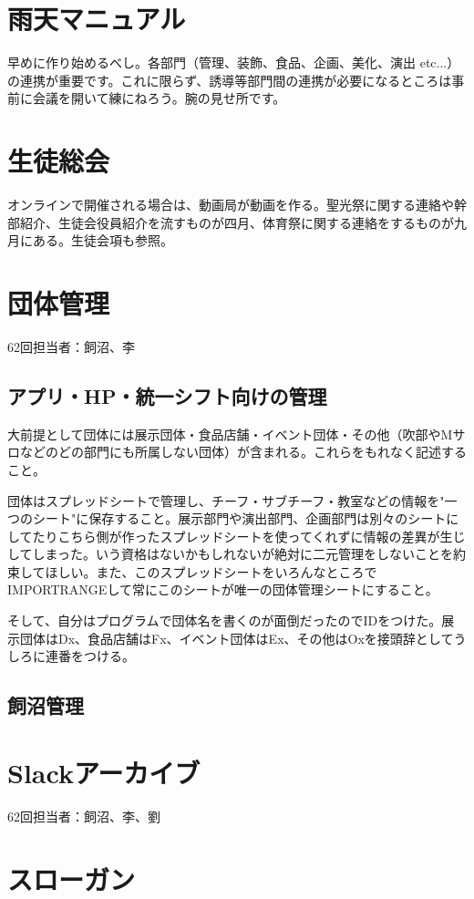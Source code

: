 \documentclass[dvipdfmx,jb5]{jreport}
\begin{document}
\section{雨天マニュアル}
早めに作り始めるべし。各部門（管理、装飾、食品、企画、美化、演出 etc...）の連携が重要です。これに限らず、誘導等部門間の連携が必要になるところは事前に会議を開いて練にねろう。腕の見せ所です。

\section{生徒総会}
オンラインで開催される場合は、動画局が動画を作る。聖光祭に関する連絡や幹部紹介、生徒会役員紹介を流すものが四月、体育祭に関する連絡をするものが九月にある。生徒会項も参照。\\


\section{団体管理}
62回担当者：飼沼、李
\subsection{アプリ・HP・統一シフト向けの管理}
大前提として団体には展示団体・食品店舗・イベント団体・その他（吹部やMサロなどのどの部門にも所属しない団体）が含まれる。これらをもれなく記述すること。

団体はスプレッドシートで管理し、チーフ・サブチーフ・教室などの情報を"一つのシート"に保存すること。展示部門や演出部門、企画部門は別々のシートにしてたりこちら側が作ったスプレッドシートを使ってくれずに情報の差異が生じしてしまった。いう資格はないかもしれないが絶対に二元管理をしないことを約束してほしい。また、このスプレッドシートをいろんなところでIMPORTRANGEして常にこのシートが唯一の団体管理シートにすること。

そして、自分はプログラムで団体名を書くのが面倒だったのでIDをつけた。展示団体はDx、食品店舗はFx、イベント団体はEx、その他はOxを接頭辞としてうしろに連番をつける。
\subsection{飼沼管理}

\section{Slackアーカイブ}
62回担当者：飼沼、李、劉


\section{スローガン}
\end{document}
